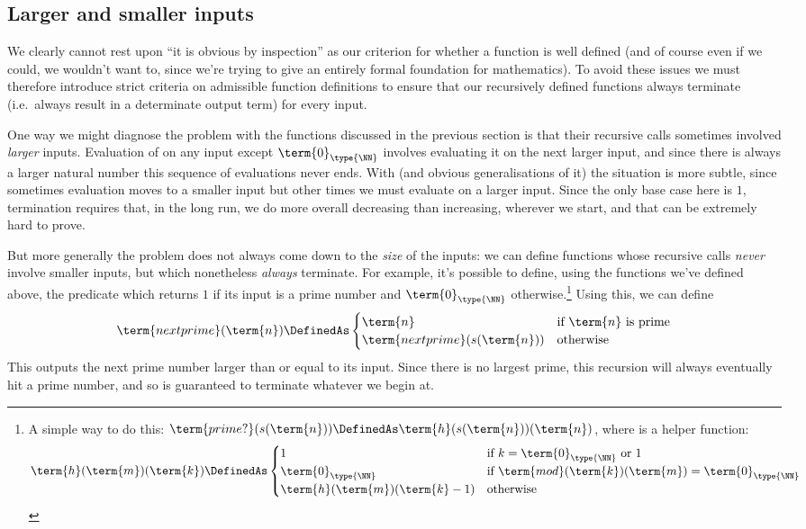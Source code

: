 \subsection{Larger and smaller inputs}

We clearly cannot rest upon ``it is obvious by inspection'' as our criterion for whether a function is well defined (and of course even if we could, we wouldn't want to, since we're trying to give an entirely formal foundation for mathematics).  To avoid these issues we must therefore introduce strict criteria on admissible function definitions to ensure that our recursively defined functions always terminate (i.e.~always result in a determinate output term) for every input.

One way we might diagnose the problem with the functions discussed in the previous section is that their recursive calls sometimes involved \emph{larger} inputs.  Evaluation of  on any input except $\term{0}_{\type{\NN}}$ involves evaluating it on the next larger input, and since there is always a larger natural number this sequence of evaluations never ends.  With  (and obvious generalisations of it) the situation is more subtle, since sometimes evaluation moves to a smaller input but other times we must evaluate on a larger input.  Since the only base case here is $1$, termination requires that, in the long run, we do more overall decreasing than increasing, wherever we start, and that can be extremely hard to prove.

But more generally the problem does not always come down to the \emph{size} of the inputs: we can define functions whose recursive calls \emph{never} involve smaller inputs, but which nonetheless \emph{always} terminate.  For example, it's possible to define, using the functions we've defined above, the predicate  which returns $1$ if its input is a prime number and $\term{0}_{\type{\NN}}$ otherwise.\footnote{
A simple way to do this: $\term{prime?}(s(\term{n})) \DefinedAs \term{h}(s(\term{n}))(\term{n})$, where  is a helper function:
\[
\term{h}(\term{m})(\term{k}) \DefinedAs
\begin{cases}
1	& \mbox{if } k= \term{0}_{\type{\NN}} \mbox{ or } 1
\\
\term{0}_{\type{\NN}} & \mbox{if } \term{mod}(\term{k})(\term{m}) = \term{0}_{\type{\NN}}
\\
\term{h}(\term{m})(\term{k} - 1)	& \mbox{otherwise}
\end{cases}
\]
}  
Using this, we can define 
\begin{align*}
\term{nextprime}(\term{n}) \DefinedAs 
\begin{cases}
\term{n} 		&\mbox{if } \term{n} \mbox{ is prime}
\\
\term{nextprime}(s(\term{n})) 	&\mbox{otherwise}
\end{cases}
\end{align*}
This outputs the next prime number larger than or equal to its input.  Since there is no largest prime, this recursion will always eventually hit a prime number, and so is guaranteed to terminate whatever  we begin at.  

